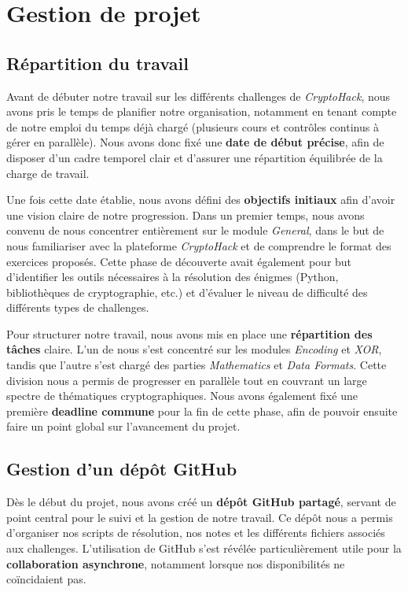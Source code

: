\section{Gestion de projet}
\subsection{Répartition du travail}
Avant de débuter notre travail sur les différents challenges de
\textit{CryptoHack}, nous avons pris le temps de planifier notre
organisation, notamment en tenant compte de notre emploi du temps déjà
chargé (plusieurs cours et contrôles continus à gérer en parallèle). Nous
avons donc fixé une \textbf{date de début précise}, afin de disposer d’un
cadre temporel clair et d’assurer une répartition équilibrée de la charge
de travail.

Une fois cette date établie, nous avons défini des \textbf{objectifs
initiaux} afin d’avoir une vision claire de notre progression. Dans un
premier temps, nous avons convenu de nous concentrer entièrement sur le
module \textit{General}, dans le but de nous familiariser avec la
plateforme \textit{CryptoHack} et de comprendre le format des exercices
proposés. Cette phase de découverte avait également pour but d’identifier
les outils nécessaires à la résolution des énigmes (Python, bibliothèques
de cryptographie, etc.) et d’évaluer le niveau de difficulté des différents
types de challenges.

Pour structurer notre travail, nous avons mis en place une
\textbf{répartition des tâches} claire. L’un de nous s’est concentré sur
les modules \textit{Encoding} et \textit{XOR}, tandis que l’autre s’est
chargé des parties \textit{Mathematics} et \textit{Data Formats}. Cette
division nous a permis de progresser en parallèle tout en couvrant un
large spectre de thématiques cryptographiques. Nous avons également fixé
une première \textbf{deadline commune} pour la fin de cette phase, afin de
pouvoir ensuite faire un point global sur l’avancement du projet.

\subsection{Gestion d'un dépôt GitHub}
Dès le début du projet, nous avons créé un \textbf{dépôt GitHub partagé},
servant de point central pour le suivi et la gestion de notre travail. Ce
dépôt nous a permis d’organiser nos scripts de résolution, nos notes et les
différents fichiers associés aux challenges. L’utilisation de GitHub s’est
révélée particulièrement utile pour la \textbf{collaboration asynchrone},
notamment lorsque nos disponibilités ne coïncidaient pas.

